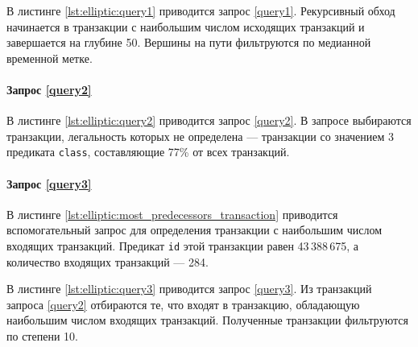 В листинге \ref{lst:elliptic:query1} приводится запрос \ref{query1}. Рекурсивный обход начинается в транзакции с
наибольшим числом исходящих транзакций и завершается на глубине 50. Вершины на пути фильтруются по медианной временной
метке.


\paragraph{Запрос \ref{query2}}

В листинге \ref{lst:elliptic:query2} приводится запрос \ref{query2}. В запросе выбираются транзакции, легальность
которых не определена --- транзакции со значением 3 предиката \texttt{class}, составляющие 77\% от всех транзакций.


\paragraph{Запрос \ref{query3}}

В листинге \ref{lst:elliptic:most_predecessors_transaction} приводится вспомогательный запрос для определения
транзакции с наибольшим числом входящих транзакций. Предикат \texttt{id} этой транзакции равен 43\,388\,675, а
количество входящих транзакций --- 284.


В листинге \ref{lst:elliptic:query3} приводится запрос \ref{query3}. Из транзакций запроса \ref{query2} отбираются те,
что входят в транзакцию, обладающую наибольшим числом входящих транзакций. Полученные транзакции фильтруются по степени 10.

